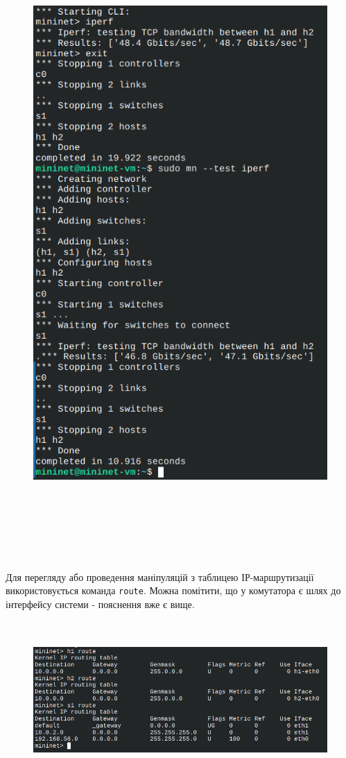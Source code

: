 \documentclass[14pt, a4paper]{extreport}
\begin{document}
	\begin{figure}[H]
		\centering
		\includegraphics[height=24cm]{13} 
	\end{figure}
	
	Для перегляду або проведення маніпуляцій з таблицею ІР-маршрутизації використовується команда \texttt{route}. Можна помітити, що у комутатора є шлях до інтерфейсу системи - пояснення вже є вище.
	
	\begin{figure}[H]
		\centering
		\includegraphics[height=6cm]{14} 
	\end{figure}
	
\end{document}
